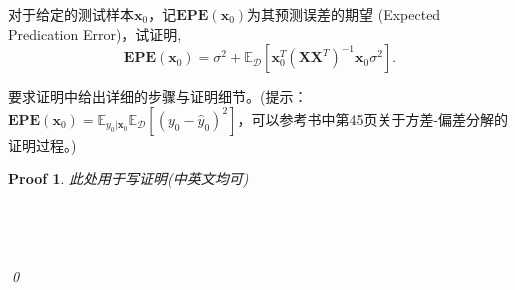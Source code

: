 \documentclass[a4paper,UTF8]{article}
\numberwithin{equation}{section}
\newtheorem*{myProof}{Proof}
\begin{document}
对于给定的测试样本$\textbf{x}_0$，记$\mathbf{EPE}(\textbf{x}_0)$为其预测误差的期望 (Expected Predication Error)，试证明,
\[
	\mathbf{EPE}(\textbf{x}_0) = \sigma^2+\mathbb{E}_{\mathcal{D}}[\textbf{x}_0^T(\textbf{X}\textbf{X}^T)^{-1}\textbf{x}_0\sigma^2].
\]

要求证明中给出详细的步骤与证明细节。(提示：$\mathbf{EPE}(\textbf{x}_0)=\mathbb{E}_{y_0|\textbf{x}_0} \mathbb{E}_{\mathcal{D}}[(y_0-\hat{y}_0)^2]$，可以参考书中第45页关于方差-偏差分解的证明过程。)

\begin{myProof}
此处用于写证明(中英文均可)
~\\
~\\
~\\
~\\
~\\
\qed
\end{myProof}
\end{document}
